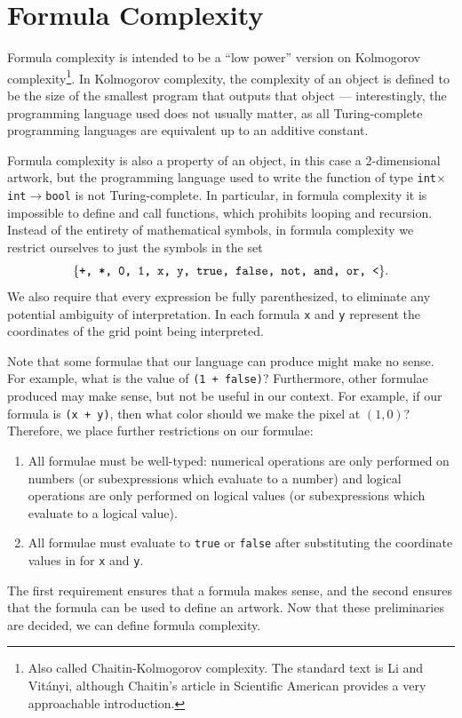 \documentclass[11pt]{article}
\begin{document}
\section*{Formula Complexity}

Formula complexity is intended to be a ``low power'' version on Kolmogorov
complexity\footnote{Also called Chaitin-Kolmogorov complexity.  The standard
text is Li and Vit\'anyi\cite{Li}, although Chaitin's article in
Scientific American\cite{chaitin} provides a very approachable introduction.}.  In
Kolmogorov complexity, the complexity of an object is defined to be the size of
the smallest program that outputs that object --- interestingly, the
programming language used does not usually matter, as all Turing-complete
programming languages are equivalent up to an additive constant.

Formula complexity is also a property of an object, in this case a
2-dimensional artwork, but the programming language used to write the function
of type {\tt int$\times$int$\to$bool} is not Turing-complete.  In particular,
in formula complexity it is impossible to define and call functions, which
prohibits looping and recursion.  Instead of the entirety of mathematical
symbols, in formula complexity we restrict ourselves to just the symbols in the
set \[\{\text{\tt +, *, 0, 1, x, y, true, false, not, and, or, <}\}.\] We also
require that every expression be fully parenthesized, to eliminate any
potential ambiguity of interpretation.  In each formula {\tt x} and {\tt y}
represent the coordinates of the grid point being interpreted.  

Note that some formulae that our language can produce might make no sense.  For
example, what is the value of {\tt (1 + false)}?  Furthermore, other formulae
produced may make sense, but not be useful in our context.  For example, if our
formula is {\tt (x + y)}, then what color should we make the pixel at $(1,0)$?
Therefore, we place further restrictions on our formulae:
\begin{enumerate}
\item All formulae must be well-typed: numerical operations are only performed
on numbers (or subexpressions which evaluate to a number) and logical operations
are only performed on logical values (or subexpressions which evaluate to a
logical value).
\item All formulae must evaluate to {\tt true} or {\tt false} after
substituting the coordinate values in for {\tt x} and {\tt y}.
\end{enumerate}
The first requirement ensures that a formula makes sense, and the second
ensures that the formula can be used to define an artwork.  Now that these
preliminaries are decided, we can define formula complexity.
\end{document}
